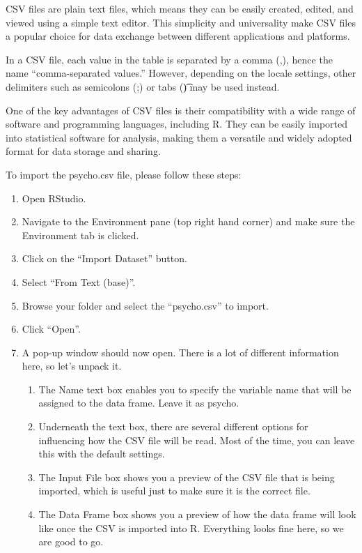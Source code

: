 \documentclass[
]{book}
\begin{document}
CSV files are plain text files, which means they can be easily created, edited, and viewed using a simple text editor. This simplicity and universality make CSV files a popular choice for data exchange between different applications and platforms.

In a CSV file, each value in the table is separated by a comma (,), hence the name ``comma-separated values.'' However, depending on the locale settings, other delimiters such as semicolons (;) or tabs (\t) may be used instead.

One of the key advantages of CSV files is their compatibility with a wide range of software and programming languages, including R. They can be easily imported into statistical software for analysis, making them a versatile and widely adopted format for data storage and sharing.

To import the psycho.csv file, please follow these steps:

\begin{enumerate}
\def\labelenumi{\arabic{enumi}.}
\item
  Open RStudio.
\item
  Navigate to the Environment pane (top right hand corner) and make sure the Environment tab is clicked.
\item
  Click on the ``Import Dataset'' button.
\item
  Select ``From Text (base)''.
\item
  Browse your folder and select the ``psycho.csv'' to import.
\item
  Click ``Open''.
\item
  A pop-up window should now open. There is a lot of different information here, so let's unpack it.

  \begin{enumerate}
  \def\labelenumii{\arabic{enumii}.}
  \item
    The Name text box enables you to specify the variable name that will be assigned to the data frame. Leave it as psycho.
  \item
    Underneath the text box, there are several different options for influencing how the CSV file will be read. Most of the time, you can leave this with the default settings.
  \item
    The Input File box shows you a preview of the CSV file that is being imported, which is useful just to make sure it is the correct file.
  \item
    The Data Frame box shows you a preview of how the data frame will look like once the CSV is imported into R. Everything looks fine here, so we are good to go.
  \end{enumerate}
\end{enumerate}
\end{document}
